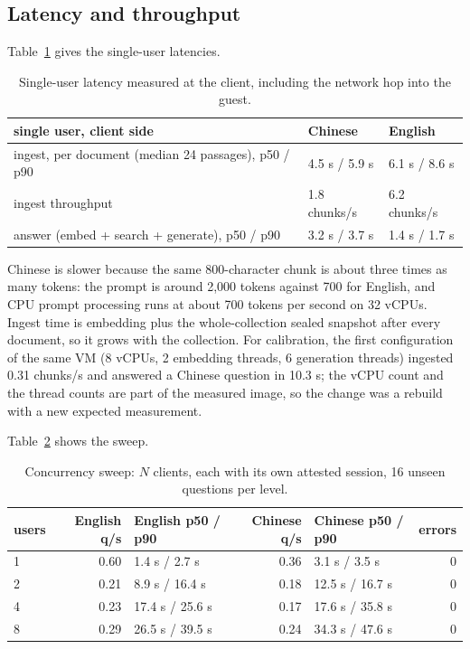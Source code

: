 \documentclass[letterpaper,twocolumn,10pt]{article}
\begin{document}
\subsection{Latency and throughput}\label{latency-and-throughput}

Table~\ref{tab:latency} gives the single-user latencies.

\begin{table}[t]\centering\small\setlength{\tabcolsep}{4pt}
\begin{tabular}{p{1.45in}ll}\toprule
\textbf{single user, client side} & \textbf{Chinese} & \textbf{English} \\ \midrule
ingest, per document (median 24 passages), p50 / p90 & 4.5 s / 5.9 s & 6.1 s / 8.6 s \\
ingest throughput & 1.8 chunks/s & 6.2 chunks/s \\
answer (embed + search + generate), p50 / p90 & 3.2 s / 3.7 s & 1.4 s / 1.7 s \\
\bottomrule\end{tabular}
\caption{Single-user latency measured at the client, including the network hop into the guest.}\label{tab:latency}
\end{table}

Chinese is slower because the same 800-character chunk is about three times as many tokens: the prompt is around 2,000 tokens against 700 for English, and CPU prompt processing runs at about 700 tokens per second on 32 vCPUs. Ingest time is embedding plus the whole-collection sealed snapshot after every document, so it grows with the collection. For calibration, the first configuration of the same VM (8 vCPUs, 2 embedding threads, 6 generation threads) ingested 0.31 chunks/s and answered a Chinese question in 10.3 s; the vCPU count and the thread counts are part of the measured image, so the change was a rebuild with a new expected measurement.

Table~\ref{tab:sweep} shows the sweep.

\begin{table}[t]\centering\small\setlength{\tabcolsep}{4pt}
\begin{tabular}{lrlrlr}\toprule
\textbf{users} & \textbf{English q/s} & \textbf{English p50 / p90} & \textbf{Chinese q/s} & \textbf{Chinese p50 / p90} & \textbf{errors} \\ \midrule
1 & 0.60 & 1.4 s / 2.7 s & 0.36 & 3.1 s / 3.5 s & 0 \\
2 & 0.21 & 8.9 s / 16.4 s & 0.18 & 12.5 s / 16.7 s & 0 \\
4 & 0.23 & 17.4 s / 25.6 s & 0.17 & 17.6 s / 35.8 s & 0 \\
8 & 0.29 & 26.5 s / 39.5 s & 0.24 & 34.3 s / 47.6 s & 0 \\
\bottomrule\end{tabular}
\caption{Concurrency sweep: $N$ clients, each with its own attested session, 16 unseen questions per level.}\label{tab:sweep}
\end{table}
\end{document}
